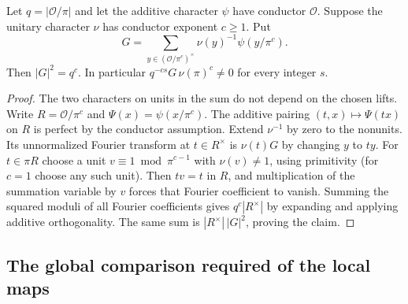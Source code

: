\begin{lemma}\label{newtheta:gauss}
Let \(q=|\mathcal O/\pi|\) and let the additive character \(\psi\)
have conductor \(\mathcal O\). Suppose the unitary character \(\nu\)
has conductor exponent \(c\ge1\). Put
\[
 G=\sum_{y\in(\mathcal O/\pi^c)^\times}
          \nu(y)^{-1}\psi(y/\pi^c).
\]
Then \(|G|^2=q^c\). In particular
\(q^{-cs}G\,\nu(\pi)^c\ne0\) for every integer \(s\).
\end{lemma}
\begin{proof}
The two characters on units in the sum do not depend on the chosen
lifts. Write \(R=\mathcal O/\pi^c\) and \(\Psi(x)=\psi(x/\pi^c)\).
The additive pairing \((t,x)\mapsto\Psi(tx)\) on \(R\) is perfect
by the conductor assumption. Extend \(\nu^{-1}\) by zero to the
nonunits. Its unnormalized Fourier transform at \(t\in R^\times\)
is \(\nu(t)G\) by changing \(y\) to \(ty\). For \(t\in\pi R\)
choose a unit \(v\equiv1\bmod\pi^{c-1}\) with \(\nu(v)\ne1\),
using primitivity (for \(c=1\) choose any such unit). Then \(tv=t\)
in \(R\), and multiplication of the summation variable by \(v\)
forces that Fourier coefficient to vanish. Summing the squared
moduli of all Fourier coefficients gives \(q^c|R^\times|\) by
expanding and applying additive orthogonality. The same sum is
\(|R^\times|\,|G|^2\), proving the claim.
\end{proof}

\subsection{The global comparison required of the local maps}\label{newtheta:global}

